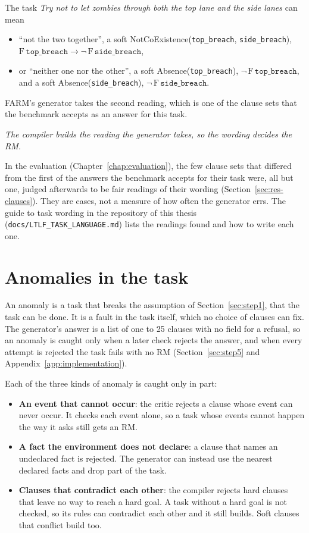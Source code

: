\documentclass[11pt,english,listoffigures,listoftables]{tfgetsinf}
\newcommand{\keyidea}[1]{\par\smallskip\noindent\hspace*{0.6em}{\color{gray!55}\vrule width 1.5pt}\hspace{8pt}\parbox[t]{\dimexpr\linewidth-0.6em-9.5pt\relax}{\itshape #1}\par\smallskip}  %
\begin{document}
The task \textit{Try not to let zombies through both the top lane and the side lanes} can mean 
\begin{itemize}
    \item ``not the two together'', a soft NotCoExistence(\texttt{top\_\allowbreak breach}, \texttt{side\_\allowbreak breach}), $\mathrm{F}\,\texttt{top\_breach} \rightarrow \neg\,\mathrm{F}\,\texttt{side\_breach}$, 
    \item or ``neither one nor the other'', a soft Absence(\texttt{top\_\allowbreak breach}), $\neg\,\mathrm{F}\,\texttt{top\_breach}$, and a soft Absence(\texttt{side\_\allowbreak breach}), $\neg\,\mathrm{F}\,\texttt{side\_breach}$. 
\end{itemize}

\noindent FARM's generator takes the second reading, which is one of the clause sets that the benchmark accepts as an answer for this task.

\keyidea{The compiler builds the reading the generator takes, so the wording decides the RM.}
\noindent In the evaluation (Chapter~\ref{chap:evaluation}), the few clause sets that differed from the first of the answers the benchmark accepts for their task were, all but one, judged afterwards to be fair readings of their wording (Section~\ref{sec:res-clauses}). They are cases, not a measure of how often the generator errs. The guide to task wording in the repository of this thesis (\texttt{docs/LTLF\_TASK\_LANGUAGE.md}) lists the readings found and how to write each one.

\section{Anomalies in the task}
\label{sec:lim-anomalies}
An anomaly is a task that breaks the assumption of Section~\ref{sec:step1}, that the task can be done. It is a fault in the task itself, which no choice of clauses can fix. The generator's answer is a list of one to 25 clauses with no field for a refusal, so an anomaly is caught only when a later check rejects the answer, and when every attempt is rejected the task fails with no RM (Section~\ref{sec:step5} and Appendix~\ref{app:implementation}).

Each of the three kinds of anomaly is caught only in part:
\begin{itemize}
    \item \textbf{An event that cannot occur}: the critic rejects a clause whose event can never occur. It checks each event alone, so a task whose events cannot happen the way it asks still gets an RM.
    \item \textbf{A fact the environment does not declare}: a clause that names an undeclared fact is rejected. The generator can instead use the nearest declared facts and drop part of the task.
    \item \textbf{Clauses that contradict each other}: the compiler rejects hard clauses that leave no way to reach a hard goal. A task without a hard goal is not checked, so its rules can contradict each other and it still builds. Soft clauses that conflict build too.
\end{itemize}
\end{document}

